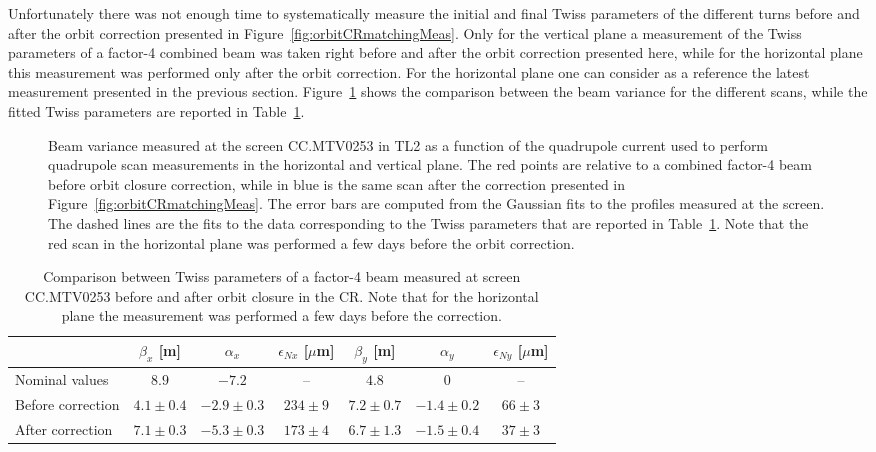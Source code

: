 Unfortunately there was not enough time to systematically measure the initial and final
Twiss parameters of the different turns before and after the orbit correction presented
in Figure~\ref{fig:orbitCRmatchingMeas}.
Only for the vertical plane a measurement of the Twiss parameters of a factor-4
combined beam was taken right before and after the orbit correction presented here,
while for the horizontal plane this measurement was performed only after the orbit
correction.
For the horizontal plane one can consider as a reference the latest measurement
presented in the previous section.
Figure~\ref{fig:orbitCRmatchingQuad} shows the comparison between the beam variance for
the different scans, while the fitted Twiss parameters are reported in
Table~\ref{tab:orbitCRmatchingQuad}.
%
\begin{figure}[b!p]
\centering
{}
\qquad
{}
\caption{Beam variance measured at the screen CC.MTV0253 in TL2 as a function of
         the quadrupole current used to perform quadrupole scan measurements
         in the horizontal \protect{} and vertical
         \protect{} plane.
         The red points are relative to a combined factor-4 beam before orbit
         closure correction, while in blue is the same scan after the correction
         presented in Figure~\ref{fig:orbitCRmatchingMeas}.
         The error bars are computed from the Gaussian fits to the profiles
         measured at the screen.
         The dashed lines are the fits to the data corresponding to the Twiss
         parameters that are reported in Table~\ref{tab:orbitCRmatchingQuad}.
         Note that the red scan in the horizontal plane was performed a few days
         before the orbit correction.}
\label{fig:orbitCRmatchingQuad}
\end{figure}
%
%
\begin{table}
\centering
\begin{tabular}{l c c c c c c}
\hline
                     & $\beta_x$  [m]  &  $\alpha_x$     &  $\epsilon_{Nx}$   [$\mu$m]   & $\beta_y$  [m]  &  $\alpha_y$     &  $\epsilon_{Ny}$   [$\mu$m]    \\
\hline
Nominal values       & $8.9$       & $-7.2$       & --             & $4.8$       & $0$       & -- \\
Before correction    & $4.1 \pm 0.4$   & $-2.9 \pm 0.3$   & $234 \pm 9$         & $7.2 \pm 0.7$   & $-1.4 \pm 0.2$   & $66 \pm 3$ \\ 
After correction     & $7.1 \pm 0.3$   & $-5.3 \pm 0.3$   & $173 \pm 4$         & $6.7 \pm 1.3$   & $-1.5 \pm 0.4$   & $37 \pm 3$ \\
\hline
\end{tabular}
\caption{Comparison between Twiss parameters of a factor-4 beam measured at 
         screen CC.MTV0253 before and after orbit closure in the CR.
         Note that for the horizontal plane the measurement was performed 
         a few days before the correction.
}
\label{tab:orbitCRmatchingQuad}
\end{table}
